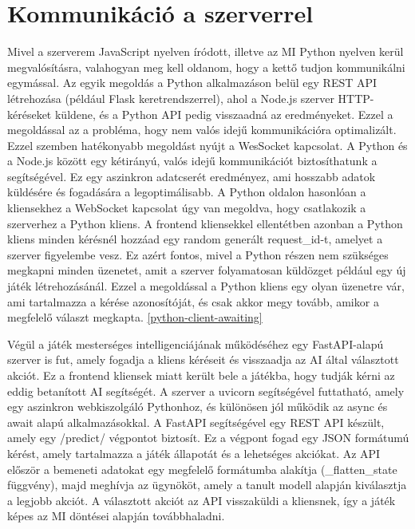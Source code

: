 \documentclass[
]{thesis-ekf}
\theoremstyle{definition}
\theoremstyle{remark}
\begin{document}
	\section{Kommunikáció a szerverrel}
	
	Mivel a szerverem JavaScript nyelven íródott, illetve az MI Python nyelven kerül megvalósításra, valahogyan meg kell oldanom, hogy a kettő tudjon kommunikálni egymással. Az egyik megoldás a Python alkalmazáson belül egy REST API létrehozása (például Flask keretrendszerrel), ahol a Node.js szerver HTTP-kéréseket küldene, és a Python API pedig visszaadná az eredményeket. Ezzel a megoldással az a probléma, hogy nem valós idejű kommunikációra optimalizált. Ezzel szemben hatékonyabb megoldást nyújt a WesSocket kapcsolat. A Python és a Node.js között egy kétirányú, valós idejű kommunikációt biztosíthatunk a segítségével. Ez egy aszinkron adatcserét eredményez, ami hosszabb adatok küldésére és fogadására a legoptimálisabb. A Python oldalon hasonlóan a kliensekhez a WebSocket kapcsolat úgy van megoldva, hogy csatlakozik a szerverhez a Python kliens. A frontend kliensekkel ellentétben azonban a Python kliens minden kérésnél hozzáad egy random generált request\_id-t, amelyet a szerver figyelembe vesz. Ez azért fontos, mivel a Python részen nem szükséges megkapni minden üzenetet, amit a szerver folyamatosan küldözget például egy új játék létrehozásánál. Ezzel a megoldással a Python kliens egy olyan üzenetre vár, ami tartalmazza a kérése azonosítóját, és csak akkor megy tovább, amikor a megfelelő választ megkapta. \ref{python-client-awaiting}
	
	
	
	Végül a játék mesterséges intelligenciájának működéséhez egy FastAPI-alapú szerver is fut, amely fogadja a kliens kéréseit és visszaadja az AI által választott akciót. Ez a frontend kliensek miatt került bele a játékba, hogy tudják kérni az eddig betanított AI segítségét. A szerver a uvicorn segítségével futtatható, amely egy aszinkron webkiszolgáló Pythonhoz, és különösen jól működik az async és await alapú alkalmazásokkal. A FastAPI segítségével egy REST API készült, amely egy /predict/ végpontot biztosít. Ez a végpont fogad egy JSON formátumú kérést, amely tartalmazza a játék állapotát és a lehetséges akciókat. Az API először a bemeneti adatokat egy megfelelő formátumba alakítja (\_flatten\_state függvény), majd meghívja az  ügynököt, amely a tanult modell alapján kiválasztja a legjobb akciót. A választott akciót az API visszaküldi a kliensnek, így a játék képes az MI döntései alapján továbbhaladni.
	
\end{document}
